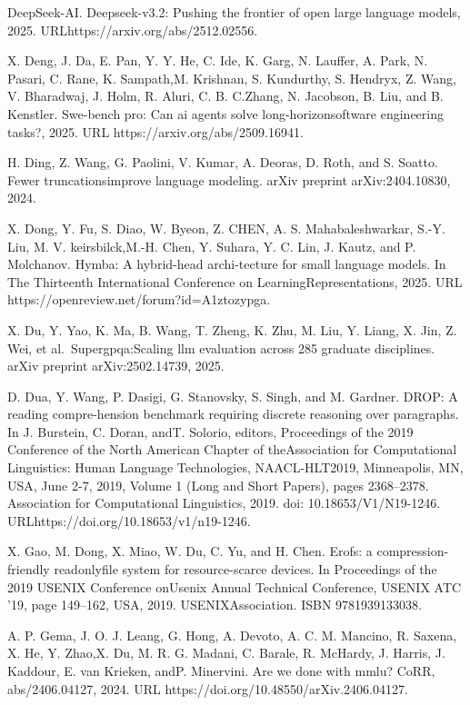 \documentclass[
  10
]{article}
\begin{document}
DeepSeek-AI. Deepseek-v3.2: Pushing the frontier of open large language
models, 2025. URLhttps://arxiv.org/abs/2512.02556.

X. Deng, J. Da, E. Pan, Y. Y. He, C. Ide, K. Garg, N. Lauffer, A. Park,
N. Pasari, C. Rane, K. Sampath,M. Krishnan, S. Kundurthy, S. Hendryx, Z.
Wang, V. Bharadwaj, J. Holm, R. Aluri, C. B. C.Zhang, N. Jacobson, B.
Liu, and B. Kenstler. Swe-bench pro: Can ai agents solve
long-horizonsoftware engineering tasks?, 2025. URL
https://arxiv.org/abs/2509.16941.

H. Ding, Z. Wang, G. Paolini, V. Kumar, A. Deoras, D. Roth, and S.
Soatto. Fewer truncationsimprove language modeling. arXiv preprint
arXiv:2404.10830, 2024.

X. Dong, Y. Fu, S. Diao, W. Byeon, Z. CHEN, A. S. Mahabaleshwarkar,
S.-Y. Liu, M. V. keirsbilck,M.-H. Chen, Y. Suhara, Y. C. Lin, J. Kautz,
and P. Molchanov. Hymba: A hybrid-head archi-tecture for small language
models. In The Thirteenth International Conference on
LearningRepresentations, 2025. URL
https://openreview.net/forum?id=A1ztozypga.

X. Du, Y. Yao, K. Ma, B. Wang, T. Zheng, K. Zhu, M. Liu, Y. Liang, X.
Jin, Z. Wei, et al.~Supergpqa:Scaling llm evaluation across 285 graduate
disciplines. arXiv preprint arXiv:2502.14739, 2025.

D. Dua, Y. Wang, P. Dasigi, G. Stanovsky, S. Singh, and M. Gardner.
DROP: A reading compre-hension benchmark requiring discrete reasoning
over paragraphs. In J. Burstein, C. Doran, andT. Solorio, editors,
Proceedings of the 2019 Conference of the North American Chapter of
theAssociation for Computational Linguistics: Human Language
Technologies, NAACL-HLT2019, Minneapolis, MN, USA, June 2-7, 2019,
Volume 1 (Long and Short Papers), pages 2368--2378. Association for
Computational Linguistics, 2019. doi: 10.18653/V1/N19-1246.
URLhttps://doi.org/10.18653/v1/n19-1246.

X. Gao, M. Dong, X. Miao, W. Du, C. Yu, and H. Chen. Erofs: a
compression-friendly readonlyfile system for resource-scarce devices. In
Proceedings of the 2019 USENIX Conference onUsenix Annual Technical
Conference, USENIX ATC '19, page 149--162, USA, 2019. USENIXAssociation.
ISBN 9781939133038.

A. P. Gema, J. O. J. Leang, G. Hong, A. Devoto, A. C. M. Mancino, R.
Saxena, X. He, Y. Zhao,X. Du, M. R. G. Madani, C. Barale, R. McHardy, J.
Harris, J. Kaddour, E. van Krieken, andP. Minervini. Are we done with
mmlu? CoRR, abs/2406.04127, 2024. URL
https://doi.org/10.48550/arXiv.2406.04127.
\end{document}
